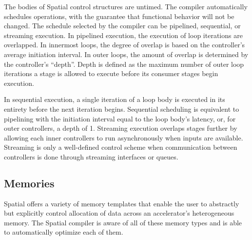 The bodies of Spatial control structures are untimed. The compiler automatically schedules operations, with the guarantee that functional behavior will not be changed.
The schedule selected by the compiler can be pipelined, sequential, or streaming execution. In pipelined execution, the execution of loop iterations are overlapped.
In innermost loops, the degree of overlap is based on the controller's average initiation interval.
In outer loops, the amount of overlap is determined by the controller's ``depth''. Depth is defined as the maximum number of outer loop iterations a stage is allowed to execute before its consumer stages begin execution.

In sequential execution, a single iteration of a loop body is executed in its entirety before the next iteration begins.
Sequential scheduling is equivalent to pipelining with the initiation interval equal to the loop body's latency, or, for outer controllers, a depth of 1. Streaming execution overlaps stages further by allowing each inner controllers to run asynchronously when inputs are available.
Streaming is only a well-defined control scheme when communication between controllers is done through streaming interfaces or queues.



\subsection{Memories}



Spatial offers a variety of memory templates that enable the user to abstractly but explicitly control allocation of data across an accelerator's heterogeneous memory.
The Spatial compiler is aware of all of these memory types and is able to automatically optimize each of them.

